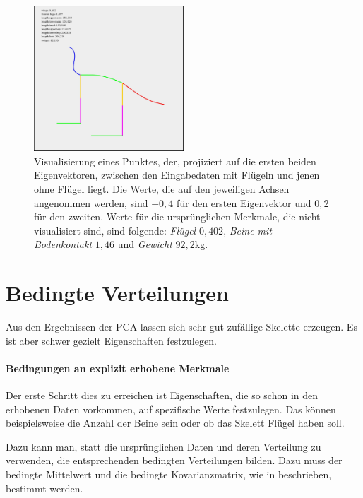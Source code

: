  \begin{figure}
  \centering
  \includegraphics[width=0.5\textwidth]{graphics/betweenClusters.jpg}
  \caption{Visualisierung eines Punktes, der, projiziert auf die ersten beiden Eigenvektoren, zwischen den Eingabedaten mit Flügeln und jenen ohne Flügel liegt. Die Werte, die auf den jeweiligen Achsen angenommen werden, sind $-0,4$ für den ersten Eigenvektor und $0,2$ für den zweiten. Werte für die ursprünglichen Merkmale, die nicht visualisiert sind, sind folgende: \emph{Flügel} $0,402$, \emph{Beine mit Bodenkontakt} $1,46$ und \emph{Gewicht} $92,2$kg.}
  \label{between_clusters}
 \end{figure}

 
 
 \section{Bedingte Verteilungen}
 \label{pca_conditions}
 
 Aus den Ergebnissen der PCA lassen sich sehr gut zufällige Skelette erzeugen. Es ist aber schwer gezielt Eigenschaften festzulegen.
 
 \paragraph{Bedingungen an explizit erhobene Merkmale}
 Der erste Schritt dies zu erreichen ist Eigenschaften, die so schon in den erhobenen Daten vorkommen, auf spezifische Werte festzulegen. Das können beispielsweise die Anzahl der Beine sein oder ob das Skelett Flügel haben soll.
 
 Dazu kann man, statt die ursprünglichen Daten und deren Verteilung zu verwenden, die entsprechenden bedingten Verteilungen bilden. Dazu muss der bedingte Mittelwert und die bedingte Kovarianzmatrix, wie in \cite[S.\ $116$ f.]{conditionalDistribution} beschrieben, bestimmt werden.
 
